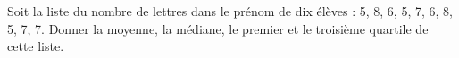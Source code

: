 
\begin{exercice}\label{exoSeconde-0074}

    Soit la liste du nombre de lettres dans le prénom de dix élèves : 5,
8,
6,
5,
7,
6,
8,
5,
7,
7.
Donner la moyenne, la médiane, le premier et le troisième quartile de cette liste.

\end{exercice}
